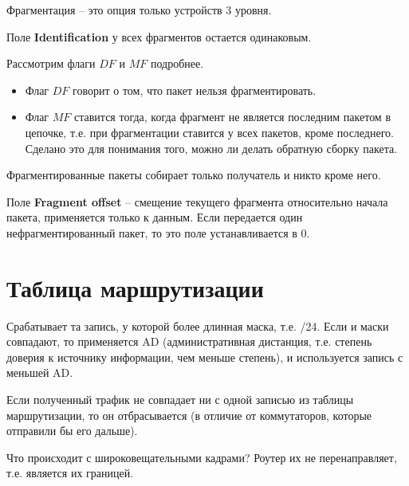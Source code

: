 Фрагментация -- это опция только устройств 3 уровня.

Поле \textbf{Identification} у всех фрагментов остается одинаковым. 

Рассмотрим флаги $DF$ и $MF$ подробнее.
\begin{itemize}
	\item Флаг $DF$ говорит о том, что пакет нельзя фрагментировать.
	\item Флаг $MF$ ставится тогда, когда фрагмент не является последним пакетом в цепочке, т.е. при фрагментации ставится у всех пакетов, кроме последнего. Сделано это для понимания того, можно ли делать обратную сборку пакета.
\end{itemize}

Фрагментированные пакеты собирает только получатель и никто кроме него.

Поле \textbf{Fragment offset} -- смещение текущего фрагмента относительно начала пакета, применяется только к данным. Если передается один нефрагментированный пакет, то это поле устанавливается в 0. 
\section{Таблица маршрутизации}
Срабатывает та запись, у которой более длинная маска, т.е. /24. Если и маски совпадают, то применяется AD (административная дистанция, т.е. степень доверия к источнику информации, чем меньше степень), и используется запись с меньшей AD. 

Если полученный трафик не совпадает ни с одной записью из таблицы маршрутизации, то он отбрасывается (в отличие от коммутаторов, которые отправили бы его дальше). 

Что происходит с широковещательными кадрами? Роутер их не перенаправляет, т.е. является их границей. 
